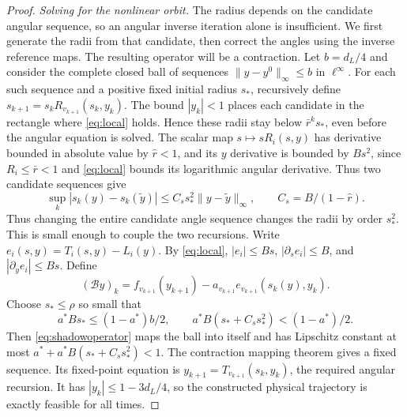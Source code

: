 \documentclass[11pt]{amsart}
\theoremstyle{definition}
\theoremstyle{remark}
\numberwithin{equation}{section}
\begin{document}
\begin{proof}
\smallskip
\emph{Solving for the nonlinear orbit.}
The radius depends on the candidate angular sequence, so an angular
inverse iteration alone is insufficient. We first generate the
radii from that candidate, then correct the angles using the
inverse reference maps. The resulting operator will be a contraction.
Let \(b=d_L/4\) and consider the complete closed ball of sequences
\(\|y-y^0\|_\infty\le b\) in \(\ell^\infty\).
For each such sequence and a positive fixed initial radius \(s_*\),
recursively define \(s_{k+1}=s_kR_{v_{k+1}}(s_k,y_k)\).
The bound $|y_k|<1$ places each candidate in the rectangle where
\eqref{eq:local} holds. Hence these radii stay below
$\bar r^ks_*$, even before the angular equation is solved.
The scalar map \(s\mapsto sR_i(s,y)\) has derivative bounded in
absolute value by \(\widehat r<1\), and its \(y\) derivative is
bounded by \(B s^2\), since \(R_i\le\bar r<1\) and \eqref{eq:local} bounds
its logarithmic angular derivative. Thus two candidate sequences give
\begin{equation}
\sup_k|s_k(y)-s_k(\widetilde y)|
       \le C_s s_*^2\|y-\widetilde y\|_\infty,
       \qquad C_s=B/(1-\widehat r).                         \label{eq:radialdependence}
\end{equation}
Thus changing the entire candidate angle sequence changes the
radii by order $s_*^2$. This is small enough to couple the two
recursions. Write \(e_i(s,y)=T_i(s,y)-L_i(y)\). By \eqref{eq:local},
\(|e_i|\le Bs\), \(|\partial_s e_i|\le B\), and
\(|\partial_y e_i|\le Bs\). Define
\begin{equation}
(\mathcal By)_k=f_{v_{k+1}}(y_{k+1})
         -a_{v_{k+1}}e_{v_{k+1}}(s_k(y),y_k).               \label{eq:shadowoperator}
\end{equation}
Choose \(s_*\le\rho\) so small that
\begin{equation}
a^*Bs_*\le(1-a^*)b/2,
 \qquad a^*B(s_*+C_s s_*^2)<(1-a^*)/2.                     \label{eq:shadowbounds}
\end{equation}
Then \eqref{eq:shadowoperator} maps the ball into itself and has Lipschitz constant at
most \(a^*+a^*B(s_*+C_s s_*^2)<1\).
The contraction mapping theorem gives a fixed sequence. Its fixed-point
equation is \(y_{k+1}=T_{v_{k+1}}(s_k,y_k)\), the required angular
recursion. It has \(|y_k|\le1-3d_L/4\), so the constructed
physical trajectory is exactly feasible for all times.


\end{proof}
\end{document}
